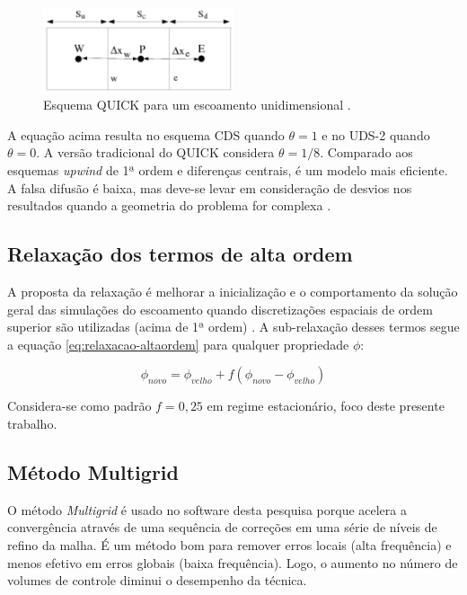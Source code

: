 \begin{figure}[!ht]
	\centering
	\includegraphics[width=0.5\textwidth]{foto03-quick-1d.png}  
	\caption[Esquema QUICK para um escoamento unidimensional.]{Esquema QUICK para um escoamento unidimensional \cite{fluent2021ansys}.}
	\label{fig:ansys-QUICK}
\end{figure}

A equação acima resulta no esquema CDS quando \(\theta = 1\) e no UDS-2 quando \(\theta = 0\). A versão tradicional do QUICK \cite{Leonard1979} considera \(\theta = 1/8\). Comparado aos esquemas \textit{upwind} de 1ª ordem e diferenças centrais, é um modelo mais eficiente. A falsa difusão é baixa, mas deve-se levar em consideração de desvios nos resultados quando a geometria do problema for complexa \cite{Leonard1979}.

\subsection{Relaxação dos termos de alta ordem}

A proposta da relaxação é melhorar a inicialização e o comportamento da solução geral das simulações do escoamento quando discretizações espaciais de ordem superior são utilizadas (acima de 1ª ordem) \cite{fluent2021ansys}. A sub-relaxação desses termos segue a equação \ref{eq:relaxacao-altaordem} para qualquer propriedade \(\phi\):

\begin{equation}
    \label{eq:relaxacao-altaordem}
    \phi_{novo} = \phi_{velho} + f(\phi_{novo} - \phi_{velho})
\end{equation}

Considera-se como padrão \(f = 0,25\) em regime estacionário, foco deste presente trabalho.

\subsection{Método Multigrid}

O método \textit{Multigrid} \cite{Hutchinson1986} é usado no software desta pesquisa porque acelera a convergência através de uma sequência de correções em uma série de níveis de refino da malha. É um método bom para remover erros locais (alta frequência) e menos efetivo em erros globais (baixa frequência). Logo, o aumento no número de volumes de controle diminui o desempenho da técnica.


